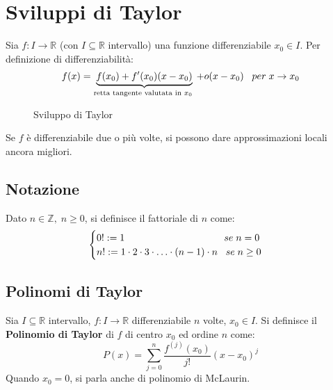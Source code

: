 \documentclass[a4paper]{article}
\theoremstyle{break}
\theoremstyle{break}
\theoremstyle{break}
\theoremstyle{break}
\begin{document}
\section{Sviluppi di Taylor}
Sia \( f: I \to \mathbb{R} \) (con \( I \subseteq \mathbb{R} \) intervallo) una funzione
differenziabile \( x_0 \in I \). Per definizione di differenziabilità:
\[
  f(x) = \underbrace{f(x_0) + f'(x_0)(x-x_0)}_{\text{retta tangente valutata in \( x_0 \) }} + o(x-x_0) \;\;\; per\; x \to x_0
\] 
\begin{figure}[H]
  \begin{center}
  \end{center}
  \caption{Sviluppo di Taylor}
\end{figure}

Se \( f \) è differenziabile due o più volte, si possono dare approssimazioni locali ancora
migliori.

\subsection{Notazione}
Dato \( n \in \mathbb{Z},\; n \ge 0 \), si definisce il fattoriale di \( n \) come:
\[
  \begin{cases}
    0! := 1 \hspace{3.6cm} se \; n = 0\\
    n! := 1 \cdot 2 \cdot 3 \cdot \ldots \cdot (n-1) \cdot n \;\;\; se\; n \ge 0
  \end{cases}
\] 
\subsection{Polinomi di Taylor}
Sia \( I \subseteq \mathbb{R} \) intervallo, \( f: I \to \mathbb{R} \) differenziabile \( n \) volte,
\( x_0 \in I \). Si definisce il \textbf{Polinomio di Taylor} di \( f \) di centro \( x_0 \) 
ed ordine \( n \) come:
\[
  P(x) = \sum_{j=0}^{n} \frac{f^{(j)}(x_0)}{j!}(x-x_0)^j
\]  
Quando \( x_0 = 0 \), si parla anche di polinomio di McLaurin.
\end{document}
